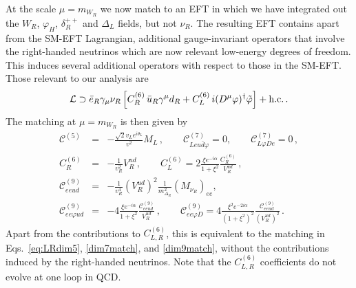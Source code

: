 \documentclass[letterpaper,11pt]{article}
\newcommand{\al}{\alpha}
\newcommand{\dt}{\delta}
\newcommand{\vL}{\ensuremath{\mathcal{L}}}
\newcommand{\Dt}{\Delta}
\newcommand{\bea}{\begin{eqnarray}}
\newcommand{\eea}{\end{eqnarray}}
\newcommand{\vp}{\varphi}
\newcommand{\sq}{^{2}}
\newcommand{\nn}{\nonumber}
\begin{document}
At the scale $\mu=m_{W_R}$ we now match to an EFT in which we have integrated out the $W_R$, $\vp_H$, $\dt_R^{++}$ and $\Dt_L$ fields, but not $\nu_R$. The resulting EFT contains apart from the SM-EFT Lagrangian, additional gauge-invariant operators that involve the right-handed neutrinos which are now relevant low-energy degrees of freedom.
This induces several additional operators with respect to those in the SM-EFT. Those relevant to our analysis are \cite{Cirigliano:2012ab}
\bea\label{eq:EFTnuR}
\vL \supset \bar e_R \gamma_\mu \nu_R \left[C_R^{(6)}\, \bar  u_R\gamma^\mu d_R + C_L^{(6)}\, i(D^\mu \vp)^\dagger \tilde \vp\right]+{\rm h.c.}\,.
\eea
The matching at $\mu=m_{W_R}$ is then given by
\bea\label{eq:LRmatchNuR}
\mathcal C^{(5)}& =&-\frac{\sqrt{2}v_Le^{i\theta_L}}{v\sq}M_L\,,\qquad
\mathcal C^{(7)}_{Leu\bar d \vp}  =0,\qquad \mathcal C^{(7)}_{L\vp De} = 0\,,\nn\\
C_{R}^{(6)}&=&-\frac{1}{v_R\sq}V_R^{ud},\qquad C_{L}^{(6)} = 2\frac{\xi e^{-i\al}}{1+\xi\sq} \frac{C_R^{(6)}}{V_R^{ud}}\,,\nn\\
\mathcal C^{(9)}_{eeud} &=&-\frac{1}{v_R^4} \left(V_{R}^{ud}\right)^2\frac{1}{m_{\Delta_R}\sq} \left(M_{\nu_R}\right)_{ee},\nn\\
\mathcal C^{(9)}_{ee\varphi u d}&=&-4\frac{\xi e^{-i\al}}{1+\xi\sq}\frac{\mathcal C^{(9)}_{eeud}}{V_{R}^{ud}}\,,\qquad 
\mathcal C_{ee \varphi D}^{(9)}=4\frac{\xi\sq e^{-2i\al}}{(1+\xi\sq)\sq}\frac{\mathcal C^{(9)}_{eeud}}{\left(V_{R}^{ud}\right)\sq}\,.
\eea
Apart from the contributions to $C_{L,R}^{(6)}$, this is equivalent to the matching in Eqs.\ \eqref{eq:LRdim5}, \eqref{dim7match}, and \eqref{dim9match}, without the contributions induced by the right-handed neutrinos. Note that the  $C_{L,R}^{(6)}$ coefficients do not evolve at one loop in QCD.
\end{document}
